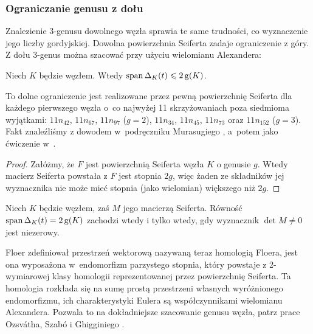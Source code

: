 
\subsubsection{Ograniczanie genusu z dołu}
Znalezienie 3-genusu dowolnego węzła sprawia te same trudności, co wyznaczenie jego liczby gordyjskiej.
Dowolna powierzchnia Seiferta zadaje ograniczenie z góry.
Z dołu 3-genus można szacować przy użyciu wielomianu Alexandera:
%

\begin{proposition}
\label{prp:alexander_genus}%
    Niech $K$ będzie węzłem.
    Wtedy $\operatorname{span} \Delta_K(t) \leqslant 2\operatorname{g}(K)$.
\end{proposition}

To dolne ograniczenie jest realizowane przez pewną powierzchnię Seiferta dla każdego pierwszego węzła o~co najwyżej 11 skrzyżowaniach poza siedmioma wyjątkami: $11n_{42}$, $11n_{67}$, $11n_{97}$ ($g = 2$), $11n_{34}$, $11n_{45}$, $11n_{73}$ oraz $11n_{152}$ ($g = 3$).
Fakt znaleźliśmy z dowodem w~podręczniku Murasugiego \cite[s. 121]{murasugi1996}, a~potem jako ćwiczenie w~\cite[s. 137]{burde2014}.

\begin{proof}
    Załóżmy, że $F$ jest powierzchnią Seiferta węzła $K$ o genusie $g$.
    Wtedy macierz Seiferta powstała z $F$ jest stopnia $2g$, więc żaden ze składników jej wyznacznika nie może mieć stopnia (jako wielomian) większego niż $2g$.
\end{proof}

\begin{proposition}
    Niech $K$ będzie węzłem, zaś $M$ jego macierzą Seiferta.
    Równość $\operatorname{span} \Delta_K(t) = 2\operatorname{g}(K)$ zachodzi wtedy i tylko wtedy, gdy wyznacznik $\det M \neq 0$ jest niezerowy.
\end{proposition}

Floer \cite{floer1990} zdefiniował przestrzeń wektorową nazywaną teraz homologią Floera, jest ona wyposażona w~endomorfizm parzystego stopnia, który powstaje z 2-wymiarowej klasy homologii reprezentowanej przez powierzchnię Seiferta.
%
Ta homologia rozkłada się na sumę prostą przestrzeni własnych wyróżnionego endomorfizmu, ich charakterystyki Eulera są współczynnikami wielomianu Alexandera.
Pozwala to na dokładniejsze szacowanie genusu węzła, patrz prace Ozsvátha, Szabó \cite{szabo2003} i Ghigginiego \cite{ghiggini2008}.
%
%
%

